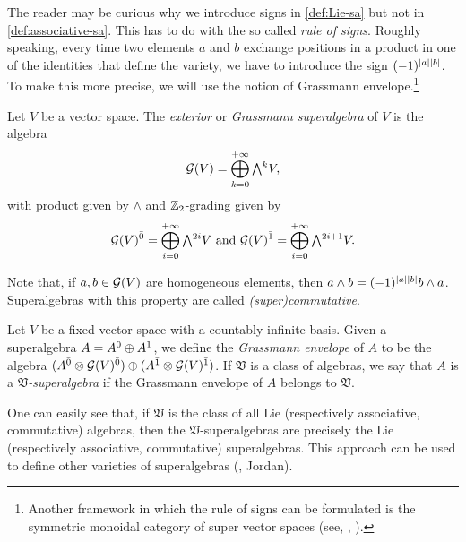 The reader may be curious why we introduce signs in \cref{def:Lie-sa} but not in \cref{def:associative-sa}. 
This has to do with the so called \emph{rule of signs}. 
Roughly speaking, every time two elements $a$ and $b$ exchange positions in a product in one of the identities that define the variety, we have to introduce the sign $(-1)^{|a||b|}$. 
To make this more precise, we will use the notion of Grassmann envelope.\footnote{Another framework in which the rule of signs can be formulated is the symmetric monoidal category of super vector spaces (see, \eg, \cite[Chapter 3]{MR2069561}).} 

\begin{defi}\label{def:Grassmann-algebra}
	Let $V$ be a vector space. 
	The \emph{exterior} or \emph{Grassmann superalgebra} of $V$ is the algebra
	\[\mc G(V) = \bigoplus_{k=0}^{+\infty} \Exterior^k V,\]
	with product given by $\wedge$ and $\mathbb{Z}_2$-grading given by 
	\[
	    \mc G(V)\even = \bigoplus_{i=0}^{+\infty}\Exterior^{2i} V \,\AND\, \mc G(V)\odd = \bigoplus_{i=0}^{+\infty}\Exterior^{2i+1} V.
	\]
\end{defi}

Note that, if $a,b \in \mathcal G(V)$ are homogeneous elements, then $a \wedge b = (-1)^{|a||b|} b \wedge a$. 
Superalgebras with this property are called \emph{(super)commutative}. 

\begin{defi}\label{Grassmann-envelope}
    Let $V$ be a fixed vector space with a countably infinite basis. 
    Given a superalgebra $A = A^{\bar0} \oplus A^{\bar1}$, we define the \emph{Grassmann envelope} of $A$ to be the algebra $(A^{\bar0}\otimes \mathcal G(V)^{\bar0}) \oplus (A^{\bar1}\otimes \mathcal G(V)^{\bar1})$. 
    If $\mathfrak{V}$ is a class of algebras, we say that $A$ is a \emph{$\mathfrak{V}$-superalgebra} if the Grassmann envelope of $A$ belongs to $\mathfrak{V}$. 
\end{defi}

One can easily see that, if $\mathfrak{V}$ is the class of all Lie (respectively associative, commutative) algebras, then the $\mathfrak{V}$-superalgebras are precisely the Lie (respectively associative, commutative) superalgebras. 
This approach can be used to define other varieties of superalgebras (\eg, Jordan). 

